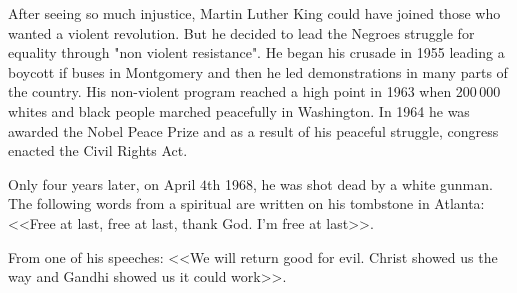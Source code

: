 After seeing so much injustice, Martin Luther King could have joined those who wanted a violent revolution. But he decided to lead the Negroes struggle for equality through "non violent resistance". He began his crusade in 1955 leading a boycott if buses in Montgomery and then he led demonstrations in many parts of the country. His non-violent program reached a high point in 1963  when 200\,000 whites and black people marched peacefully in Washington. In 1964 he was awarded the Nobel Peace Prize and as a result of his peaceful struggle, congress enacted the Civil Rights Act.

Only four years later, on April $4$th 1968, he was shot dead by a white gunman. The following words from a spiritual are written on his tombstone in Atlanta: <<Free at last, free at last, thank God. I'm free at last>>.

From one of his speeches: <<We will return good for evil. Christ showed us the way and Gandhi showed us it could work>>.
